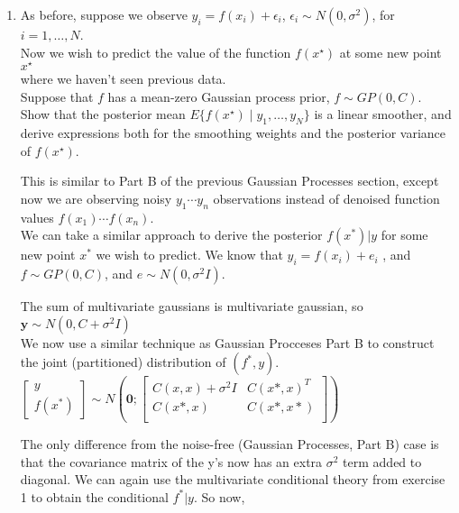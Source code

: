 \documentclass{homework}
\newcommand{\1}{\mathbf{1}}
\begin{document}
\begin{enumerate}[label=(\Alph*)]
\item As before, suppose we observe $y_i = f(x_i) + \epsilon_i$, $\epsilon_i \sim N(0, \sigma^2)$, for $i=1, \ldots, N$.  \\Now we wish to predict the value of the function $f(x^{\star})$ at some new point $x^{\star}$ \\where we haven't seen previous data.  \\Suppose that $f$ has a mean-zero Gaussian process prior, $f \sim GP(0, C)$.  \\Show that the posterior mean $E\{ f(x^{\star}) \mid y_1, \ldots, y_N \}$ is a linear smoother, and \\derive expressions both for the smoothing weights and the posterior variance of $f(x^{\star})$.
\\
\par This is similar to Part B of the previous Gaussian Processes section, except now we are observing noisy
$y_1\cdots y_n$ observations instead of denoised function values $f(x_1) \cdots f(x_n)$. 
\\We can take a similar approach to derive the posterior $f(x^*)|y$ for some new point $x^*$ we wish to predict.
We know that $y_i = f(x_i) + e_i$ , and $f \sim GP(0, C)$, and $e \sim N(0, \sigma^2 I)$.\\
\par The sum of multivariate gaussians is multivariate gaussian, so $\textbf{y} \sim N(0, C + \sigma^2I)$\\
We now use a similar technique as Gaussian Procceses Part B to construct the joint (partitioned) distribution
of $(f^*, y)$.\\
$  \begin{bmatrix} y \\ f(x^*)  \end{bmatrix}
\sim N \left(  \textbf{0} 
; \begin{bmatrix} 
C(x,x) + \sigma^2I & C(x*,x)^T \\ 
C(x*,x)  & C(x*,x*) \\ 
\end{bmatrix} \right)$\\
\par The only difference from the noise-free (Gaussian Processes, Part B) case is that the covariance matrix of the y's now has an extra $\sigma^2$ term added to diagonal. We can again use the multivariate conditional theory from exercise 1 to obtain the conditional $f^*|y$.
So now, \\
\begin{equation} \begin{split}

\end{split}
\end{equation}
\end{enumerate}
\end{document}
